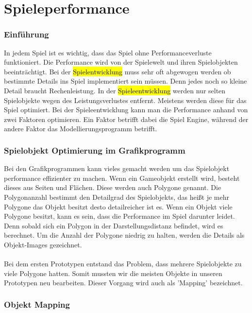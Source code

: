 
\pagebreak
{}
\chapter{Spieleperformance}


\subsection{Einführung}
In jedem Spiel ist es wichtig, dass das Spiel ohne Performanceverluste funktioniert. Die Performance wird von der Spielewelt und ihren Spielobjekten beeinträchtigt. Bei der \hl{Spielentwicklung} muss sehr oft abgewogen werden ob bestimmte Details ins Spiel implementiert sein müssen. Denn jedes noch so kleine Detail braucht Rechenleistung. In der \hl{Spieleentwicklung} werden nur selten Spielobjekte wegen des Leistungsverlustes entfernt. Meistens werden diese für das Spiel optimiert. Bei der Spieleentwicklung kann man die Performance anhand von zwei Faktoren optimieren. Ein Faktor betrifft dabei die Spiel Engine, während der andere Faktor das Modellierungsprogramm betrifft. 

\subsection{Spielobjekt Optimierung im Grafikprogramm}
Bei den Grafikprogrammen kann vieles gemacht werden um das Spielobjekt performance effizienter zu machen. Wenn ein Gameobjekt erstellt wird, besteht dieses aus Seiten und Flächen. Diese werden auch Polygone genannt. Die Polygonanzahl bestimmt den Detailgrad des Spielobjekts, das heißt je mehr Polygone das Objekt besitzt desto detailreicher ist es. Wenn ein Objekt viele Polygone besitzt, kann es sein, dass die Performance im Spiel darunter leidet. Denn sobald sich ein Polygon in der Darstellungsdistanz befindet, wird es berechnet. Um die Anzahl der Polygone niedrig zu halten, werden die Details als \glqq Objekt-Images \grqq \space gezeichnet. \\\\ 
Bei dem ersten Prototypen entstand das Problem, dass mehrere Spielobjekte zu viele Polygone hatten. Somit mussten wir die meisten Objekte in unseren Prototypen neu bearbeiten. Dieser Vorgang wird auch als 'Mapping' bezeichnet.
\pagebreak
\subsection{Objekt Mapping}

